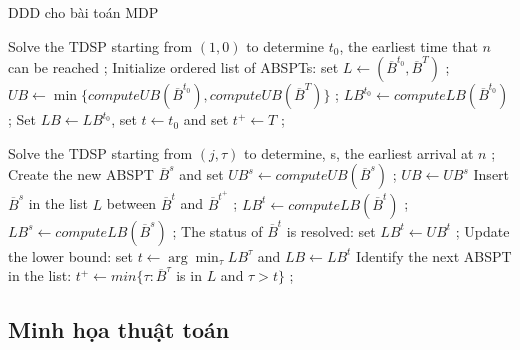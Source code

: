 \documentclass[../main.tex]{subfiles}
\begin{document}
\begin{algorithm}[H]
\caption{DDD cho bài toán MDP}
\label{algo:1}
\begin{algorithmic}

\State Solve the TDSP starting from $(1, 0)$ to determine $t_0$, the earliest time that $n$ can be reached ;
\State Initialize ordered list of ABSPTs: set $L \leftarrow (\overline{B}^{t_0}, \overline{B}^{T})$  ;
\State $UB \leftarrow \min\{ computeUB(\overline{B}^{t_0}), computeUB(\overline{B}^{T})\}$ ;
\State $LB^{t_0} \leftarrow computeLB(\overline{B}^{t_0})$ ;
\State Set $LB \leftarrow LB^{t_0}$, set $t \leftarrow t_0$ and set $t^+ \leftarrow T$ ;

        \State Solve the TDSP starting from $(j, \tau)$ to determine, s, the earliest arrival at $n$ ;
        \State Create the new ABSPT $\overline{B}^s$ and set $UB^s \leftarrow computeUB(\overline{B}^s)$ ;
            \State $UB \leftarrow UB^s$
        \EndIf
        \State Insert $\overline{B}^s$ in the list $L$ between $\overline{B}^t$ and $\overline{B}^{t^+}$ ;
        \State $LB^t \leftarrow computeLB(\overline{B}^t)$ ;
        \State $LB^s \leftarrow computeLB(\overline{B}^s)$ ;
    \Else
        \State The status of $\overline{B}^t$ is resolved: set $LB^t \leftarrow UB^t$ ;
    \EndIf
    \State Update the lower bound: set $t \leftarrow \arg\min_{\tau}LB^{\tau}$ and $LB\leftarrow LB^t$ 
    \State Identify the next ABSPT in the list: $t^+ \leftarrow min\{\tau : \overline{B}^{\tau}$ is in $L$ and $\tau > t \}$ ;
\EndWhile
  
  \end{algorithmic}
\end{algorithm}

\subsection{Minh họa thuật toán}\label{minh-houx1ea1-thuux1eadt-touxe1n}
\end{document}
